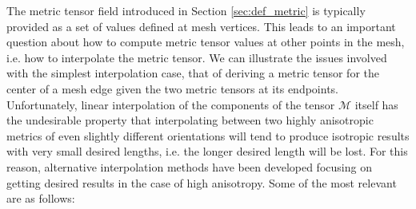 The metric tensor field introduced in Section \ref{sec:def_metric}
is typically provided as a set of values defined at mesh vertices.
This leads to an important question about how to compute metric
tensor values at other points in the mesh, i.e. how to interpolate
the metric tensor.
We can illustrate the issues involved with the simplest interpolation
case, that of deriving a metric tensor for the center of a mesh
edge given the two metric tensors at its endpoints.
Unfortunately, linear interpolation of the components of the
tensor $\mathcal{M}$ itself has the undesirable property that
interpolating between two highly anisotropic metrics of even
slightly different orientations will tend to produce isotropic
results with very small desired lengths, i.e. the longer desired
length will be lost.
For this reason, alternative interpolation methods have been developed
focusing on getting desired results in the case of high anisotropy.
Some of the most relevant are as follows:


